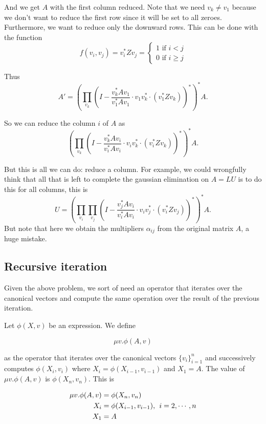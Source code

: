 And we get $A$ with the first column reduced. Note that we need $v_k\neq v_1$ because we don't want to reduce the first row since it will be set to all zeroes. Furthermore, we want to reduce only the downward rows. This can be done with the function 
\[
  			f(v_i, v_j)=v_i^*Zv_j=\begin{cases}
               1 \text{ if } i < j \\
               0 \text{ if } i \geq j
            \end{cases}
		\]

Thus $$A'=\left(\prod_{v_k}\left(I-\dfrac{v_k^*Av_1}{v_1^*Av_1}\cdot v_1v_k^*\cdot\left(v_1^*Zv_k\right)\right)^*\right)^*A.$$

So we can reduce the column $i$ of $A$ as $$\left(\prod_{v_k}\left(I-\dfrac{v_k^*Av_i}{v_i^*Av_i}\cdot v_iv_k^*\cdot\left(v_i^*Zv_k\right)\right)^*\right)^*A.$$

But this is all we can do: reduce a column. For example, we could wrongfully think that all that is left to complete the gaussian elimination on $A=LU$ is to do this for all columns, this is $$U=\left(\prod_{v_i}\prod_{v_j}\left(I-\dfrac{v_j^*Av_i}{v_i^*Av_i}\cdot v_iv_j^*\cdot\left(v_i^*Zv_j\right)\right)^*\right)^*A.$$
But note that here we obtain the multipliers $\alpha_{ij}$ from the original matrix $A$, a huge mistake.

\subsection*{Recursive iteration}

Given the above problem, we sort of need an operator that iterates over the canonical vectors and compute the same operation over the result of the previous iteration.

Let $\phi(X,v)$ be an expression. We define

$$\mu v.\phi(A,v)$$

as the operator that iterates over the canonical vectors $\lbrace v_i\rbrace_{i=1}^n$ and successively computes $\phi(X_i,v_i)$ where $X_i=\phi(X_{i-1}, v_{i-1})$ and $X_1=A$. The value of $\mu v.\phi(A,v)$ is $\phi(X_n, v_n)$. This is

\begin{align*}
\mu v.\phi(A,v)&=\phi(X_n, v_n) \\
X_i&=\phi(X_{i-1}, v_{i-1}),\hspace{1ex}i=2,\cdots, n \\
X_1&=A
\end{align*}

